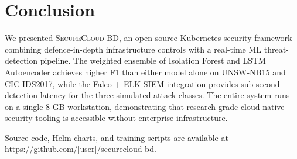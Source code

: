 \section{Conclusion}
\label{sec:conclusion}

We presented \textsc{SecureCloud-BD}, an open-source Kubernetes security
framework combining defence-in-depth infrastructure controls with a
real-time ML threat-detection pipeline.
The weighted ensemble of Isolation Forest and LSTM Autoencoder achieves
higher F1 than either model alone on UNSW-NB15 and CIC-IDS2017, while
the Falco + ELK SIEM integration provides sub-second detection latency
for the three simulated attack classes.
The entire system runs on a single 8-GB workstation, demonstrating that
research-grade cloud-native security tooling is accessible without
enterprise infrastructure.

Source code, Helm charts, and training scripts are available at
\url{https://github.com/[user]/securecloud-bd}.

